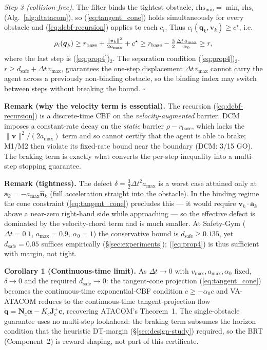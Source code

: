 \documentclass[letterpaper]{article}
\begin{document}
\emph{Step 3 (collision-free).} The filter binds the tightest obstacle, $\text{rhs}_{\min} = \min_i \text{rhs}_i$ (Alg.~\ref{alg:dtatacom}), so (\ref{eq:tangent_cone}) holds simultaneously for every obstacle and (\ref{eq:dcbf-recursion}) applies to each $c_i$. Thus $c_i(\boldsymbol{q}_k,\boldsymbol{v}_k) \ge c^\star$, i.e.
\begin{equation}
\rho_i(\boldsymbol{q}_k) \ge r_\text{base} + \tfrac{\|\boldsymbol{v}_k\|^2}{2a_{\max}} + c^\star \ge r_\text{base} - \tfrac{3}{2}\tfrac{\Delta t\,a_{\max}}{\alpha_0} \ge r,
\notag
\end{equation}
where the last step is (\ref{eq:prop4})$_2$. The separation condition (\ref{eq:prop4})$_3$, $r \ge d_\text{safe} + \Delta t\,v_{\max}$, guarantees the one-step displacement $\Delta t\,v_{\max}$ cannot carry the agent across a previously non-binding obstacle, so the binding index may switch between steps without breaking the bound. $\square$

\textbf{Remark (why the velocity term is essential).} The recursion (\ref{eq:dcbf-recursion}) is a discrete-time CBF on the \emph{velocity-augmented} barrier. DCM \cite{agrawal2017} imposes a constant-rate decay on the \emph{static} barrier $\rho - r_\text{base}$, which lacks the $\|\boldsymbol{v}\|^2/(2a_{\max})$ term and so cannot certify that the agent is able to brake; M1/M2 then violate its fixed-rate bound near the boundary (DCM: 3/15 GO). The braking term is exactly what converts the per-step inequality into a multi-step stopping guarantee.

\textbf{Remark (tightness).} The defect $\delta = \tfrac{3}{2}\Delta t^2 a_{\max}$ is a worst case attained only at $\boldsymbol{a}_k = -a_{\max}\hat{\boldsymbol{n}}_k$ (full acceleration straight into the obstacle). In the binding regime the cone constraint (\ref{eq:tangent_cone}) precludes this --- it would require $\boldsymbol{v}_k\!\cdot\!\boldsymbol{a}_k$ above a near-zero right-hand side while approaching --- so the effective defect is dominated by the velocity-chord term and is much smaller. At Safety-Gym ($\Delta t{=}0.1$, $a_{\max}{=}0.9$, $\alpha_0{=}1$) the conservative bound is $d_\text{safe} \ge 0.135$, yet $d_\text{safe} = 0.05$ suffices empirically (\S\ref{sec:experiments}); (\ref{eq:prop4}) is thus sufficient with margin, not tight.

\textbf{Corollary 1 (Continuous-time limit).} As $\Delta t \to 0$ with $v_{\max}, a_{\max}, \alpha_0$ fixed, $\delta \to 0$ and the required $d_\text{safe} \to 0$: the tangent-cone projection (\ref{eq:tangent_cone}) becomes the continuous-time exponential-CBF condition $\dot c \ge -\alpha_0 c$ and VA-ATACOM reduces to the continuous-time tangent-projection flow $\dot{\boldsymbol{q}} = \boldsymbol{N}_c\boldsymbol{\alpha} - K_c\boldsymbol{J}_c^+\boldsymbol{c}$, recovering ATACOM's Theorem~1. The single-obstacle guarantee uses no multi-step lookahead: the braking term subsumes the horizon condition that the heuristic DT-margin (\S\ref{sec:design-study}) required, so the BRT (Component~2) is reward shaping, not part of this certificate.
\end{document}

